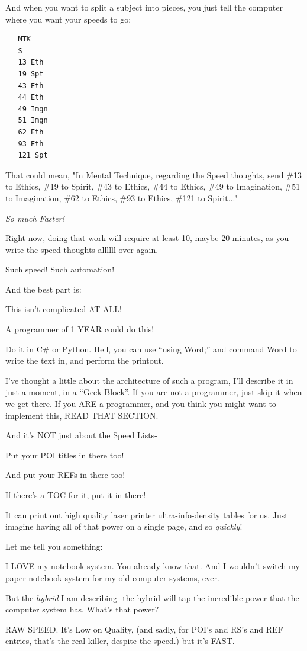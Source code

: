 \documentclass[oneside]{book}
\begin{document}
And when you want to split a subject into pieces, you just tell the
computer where you want your speeds to go:

\begin{verbatim}
   MTK
   S
   13 Eth
   19 Spt
   43 Eth
   44 Eth
   49 Imgn
   51 Imgn
   62 Eth
   93 Eth
   121 Spt
\end{verbatim}

That could mean, "In Mental Technique, regarding the Speed thoughts,
send \#13 to Ethics, \#19 to Spirit, \#43 to Ethics, \#44 to Ethics, \#49
to Imagination, \#51 to Imagination, \#62 to Ethics, \#93 to Ethics, \#121
to Spirit..."

\emph{So much Faster!}

Right now, doing that work will require at least 10, maybe 20 minutes,
as you write the speed thoughts allllll over again.

Such speed! Such automation!

And the best part is:

This isn't complicated AT ALL!

A programmer of 1 YEAR could do this!

Do it in C\# or Python. Hell, you can use ``using Word;'' and command
Word to write the text in, and perform the printout.

I've thought a little about the architecture of such a program, I'll
describe it in just a moment, in a ``Geek Block''. If you are not a
programmer, just skip it when we get there. If you ARE a programmer,
and you think you might want to implement this, READ THAT SECTION.

And it's NOT just about the Speed Lists-

Put your POI titles in there too!

And put your REFs in there too!

If there's a TOC for it, put it in there!

It can print out high quality laser printer ultra-info-density tables
for us. Just imagine having all of that power on a single page, and so
\emph{quickly}!

Let me tell you something:

I LOVE my notebook system. You already know that. And I wouldn't
switch my paper notebook system for my old computer systems, ever.

But the \emph{hybrid} I am describing- the hybrid will tap the incredible
power that the computer system has. What's that power?

RAW SPEED. It's Low on Quality, (and sadly, for POI's and RS's and REF
entries, that's the real killer, despite the speed.) but it's FAST.
\end{document}
